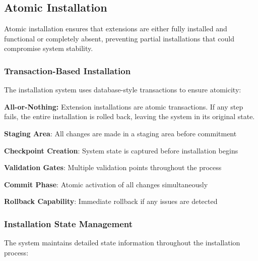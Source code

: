 \subsection{Atomic Installation}
\label{subsec:atomic-installation}

Atomic installation ensures that extensions are either fully installed and functional or completely absent, preventing partial installations that could compromise system stability.

\subsubsection{Transaction-Based Installation}
\label{subsubsec:transaction-based-installation}

The installation system uses database-style transactions to ensure atomicity:

\begin{successbox}
\textbf{All-or-Nothing:} Extension installations are atomic transactions. If any step fails, the entire installation is rolled back, leaving the system in its original state.
\end{successbox}

\begin{compactlist}
\item \textbf{Staging Area}: All changes are made in a staging area before commitment
\item \textbf{Checkpoint Creation}: System state is captured before installation begins
\item \textbf{Validation Gates}: Multiple validation points throughout the process
\item \textbf{Commit Phase}: Atomic activation of all changes simultaneously
\item \textbf{Rollback Capability}: Immediate rollback if any issues are detected
\end{compactlist}

\subsubsection{Installation State Management}
\label{subsubsec:installation-state-management}

The system maintains detailed state information throughout the installation process:

